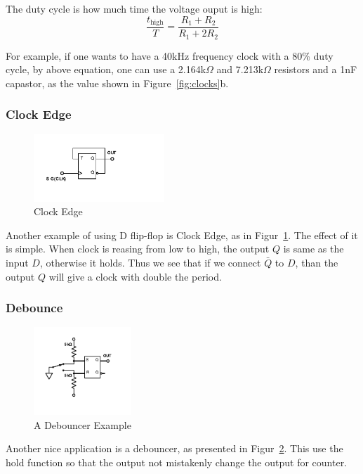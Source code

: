 \documentclass[aps,prl,reprint]{revtex4-1}
\begin{document}
            The duty cycle is how much time the voltage ouput is high:
            \[
            \frac{t_\text{high}}{T} = \frac{R_1 + R_2}{R_1 + 2R_2}
            \]

            For example, if one wants to have a 40kHz frequency clock with a 80\% duty cycle, by above equation, one can use a 2.164k$\Omega$ and 7.213k$\Omega$ resistors and a 1nF capastor, as the value shown in Figure~\ref{fig:clocks}b.
        \subsubsection{Clock Edge}
            \begin{figure}[h]
                \centering
                \includegraphics[height=1in]{image/Clock-Edge.pdf}
                \caption{Clock Edge}
                \label{fig:clockEdge}
            \end{figure}
            Another example of using D flip-flop is Clock Edge, as in Figur~\ref{fig:clockEdge}. The effect of it is simple. When clock is reasing from low to high, the output $Q$ is same as the input $D$, otherwise it holds. Thus we see that if we connect $\bar Q$ to $D$, than the output $Q$ will give a clock with double the period.
        \subsubsection{Debounce}
            \begin{figure}[h]
                \centering
                \includegraphics[height=1.3in]{image/Debouncer.pdf}
                \caption{A Debouncer Example}
                \label{fig:debouncer}
            \end{figure}
            Another nice application is a debouncer, as presented in Figur~\ref{fig:debouncer}. This use the hold function so that the output not mistakenly change the output for counter.
\end{document}
